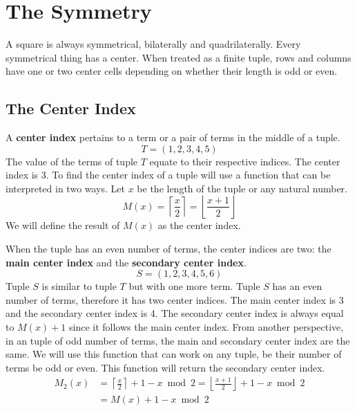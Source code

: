\documentclass[twoside,openany,12pt]{book}
\begin{document}
    \chapter{The Symmetry} \label{symmetry}
    A square is always symmetrical, bilaterally and quadrilaterally. Every symmetrical thing has a center. When treated as a finite tuple, rows and columns have one or two center cells depending on whether their length is odd or even.

    \section{The Center Index} \label{center_index}
    A \textbf{center index} pertains to a term or a pair of terms in the middle of a tuple.
    \begin{equation*}
        T = (1,2,3,4,5)
    \end{equation*}
    The value of the terms of tuple $T$ equate to their respective indices. The center index is 3. To find the center index of a tuple will use a function that can be interpreted in two ways. Let $x$ be the length of the tuple or any natural number.
    \begin{equation}
        M(x) = \left\lceil \frac{x}{2} \right\rceil = \left\lfloor \frac{x+1}{2} \right\rfloor
    \end{equation}
    We will define the result of $M(x)$ as the center index. 

    When the tuple has an even number of terms, the center indices are two: the \textbf{main center index} and the \textbf{secondary center index}.
    \begin{equation*}
        S = (1,2,3,4,5,6)
    \end{equation*}
    Tuple $S$ is similar to tuple $T$ but with one more term. Tuple $S$ has an even number of terms, therefore it has two center indices. The main center index is 3 and the secondary center index is 4. The secondary center index is always equal to $M(x) + 1$ since it follows the main center index. From another perspective, in an tuple of odd number of terms, the main and secondary center index are the same. We will use this function that can work on any tuple, be their number of terms be odd or even. This function will return the secondary center index.
    \begin{equation} \label{even_center_indices}
      \begin{split}
        M_{2}(x)  &= \left\lceil \frac{x}{2} \right\rceil + 1 - x\bmod 2 = \left\lfloor \frac{x+1}{2} \right\rfloor + 1 - x\bmod 2 \\
                  &= M(x) + 1 - x\bmod 2
      \end{split}
    \end{equation}
\end{document}
